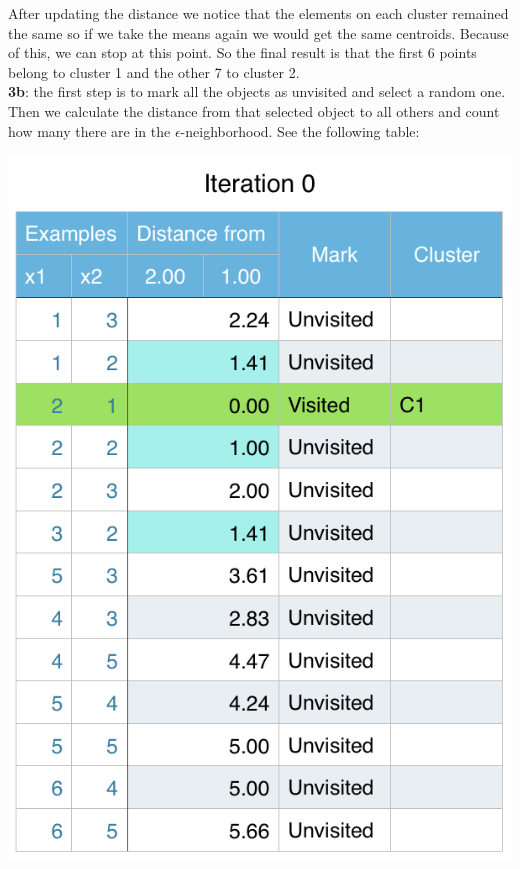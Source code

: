 \documentclass[11pt]{article}
\begin{document}
After updating the distance we notice that the elements on each cluster remained the same so if we take the means again we would get the same centroids. Because of this, we can stop at this point. So the final result is that the first 6 points belong to cluster 1 and the other 7 to cluster 2.\\

\textbf{3b}:  the first step is to mark all the objects as unvisited and select a random one. Then we calculate the distance from that selected object to all others and count how many there are in the $\epsilon$-neighborhood. See the following table:

\begin{center}
\includegraphics[scale=0.60]{dbscan-iter0.png}
\end{center}
\end{document}
